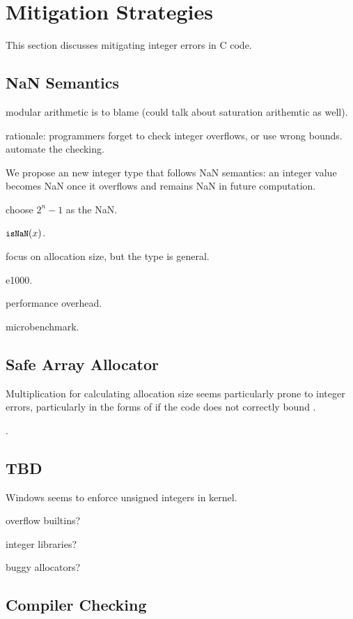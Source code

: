 \section{Mitigation Strategies}
\label{s:miti}

This section discusses mitigating integer errors
in C code.

\subsection{NaN Semantics}

modular arithmetic is to blame (could talk about saturation arithemtic
as well).

rationale: programmers forget to check integer overflows,
or use wrong bounds.  automate the checking.

We propose an new integer type that follows NaN semantics: an
integer value becomes NaN once it overflows and remains NaN in
future computation.

choose $2^n-1$ as the NaN.

$\cc{isNaN}(x)$.

focus on allocation size, but the type is general.

e1000.

performance overhead.

microbenchmark.

\subsection{Safe Array Allocator}


Multiplication for calculating allocation size seems particularly
prone to integer errors, particularly in the forms of  if the code does not correctly bound .

.

\subsection{TBD}

Windows seems to enforce unsigned integers in kernel.

overflow builtins?

integer libraries?

buggy allocators?


\subsection{Compiler Checking}

